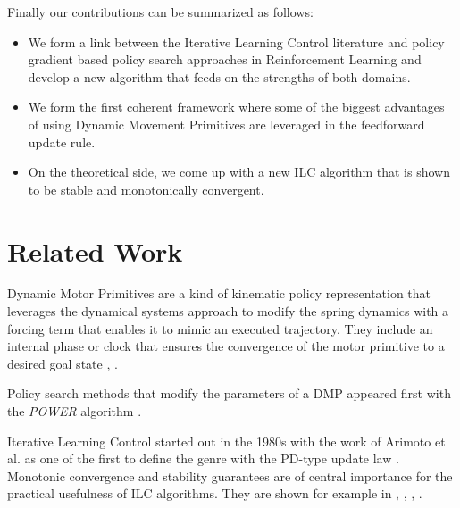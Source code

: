 \documentclass[10pt,a4paper]{article}
\begin{document}
Finally our contributions can be summarized as follows:

\begin{itemize}
\item We form a link between the Iterative Learning Control literature and policy gradient based policy search approaches in Reinforcement Learning and develop a new algorithm that feeds on the strengths of both domains.

\item We form the first coherent framework where some of the biggest advantages of using Dynamic Movement Primitives are leveraged in the feedforward update rule.

\item On the theoretical side, we come up with a new ILC algorithm that is shown to be stable and monotonically convergent.
\end{itemize}


\section{Related Work}

Dynamic Motor Primitives are a kind of kinematic policy representation that leverages the dynamical systems approach to modify the spring dynamics with a forcing term that enables it to mimic an executed trajectory. They include an internal phase or clock that ensures the convergence of the motor primitive to a desired goal state \cite{Ijspeert13}, \cite{Schaal07}. 


Policy search methods that modify the parameters of a DMP appeared first with the \emph{POWER} algorithm \cite{Kober08}.

Iterative Learning Control started out in the 1980s with the work of Arimoto et al. \cite{Arimoto84} as one of the first to define the genre with the PD-type update law \cite{Bristow06}. Monotonic convergence and stability guarantees are of central importance for the practical usefulness of ILC algorithms. They are shown for example in \cite{Bristow06}, \cite{Norrloef02}, \cite{Lee97}, \cite{Longman2000}.
\end{document}
